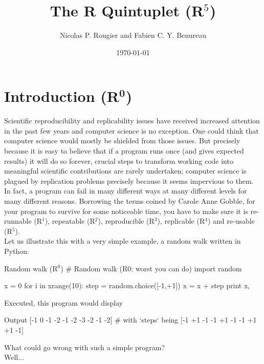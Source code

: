 \documentclass[a4paper,11pt]{article}
\title{The R Quintuplet (R$^5$)}
\author{Nicolas P. Rougier and Fabien C. Y. Benureau}
\date{\today}
\begin{document}
\maketitle


\section*{Introduction (R$^{\mathbf 0}$)}

Scientific reproducibility and replicability issues have received increased attention in the past few years and computer science is no exception.
One could think that computer science would mostly be shielded from those issues. 
But precisely because it is easy to believe that if a program runs once (and gives expected results) it will do so forever, crucial steps to transform working code into meaningful scientific contributions are rarely undertaken; computer science is plagued by replication problems precisely because it seems impervious to them.\\

In fact, a program can fail in many different ways at many different levels for many different reasons.
Borrowing the terms coined by Carole Anne Gobble, for your program to survive for some noticeable time, you have to make sure it is re-runnable (R$^1$), repeatable (R$^2$), reproducible (R$^3$), replicable (R$^4$) and re-usable (R$^5$).\\

Let us illustrate this with a very simple example, a random walk written in Python:

\begin{code}{Random walk (R$^0$)}
# Random walk (R0: worst you can do)
import random

x = 0
for i in xrange(10):
    step = random.choice([-1,+1])
    x = x + step
    print x,
\end{code}

Executed, this program would display 
\begin{code}{Output}
[-1  0 -1 -2 -1 -2 -3 -2 -1 -2] # with `steps` being [-1 +1 -1 -1 +1 -1 -1 +1 +1 -1]
\end{code}

What could go wrong with such a simple program?\\
\vfill
Well...
\vfill
\end{document}
